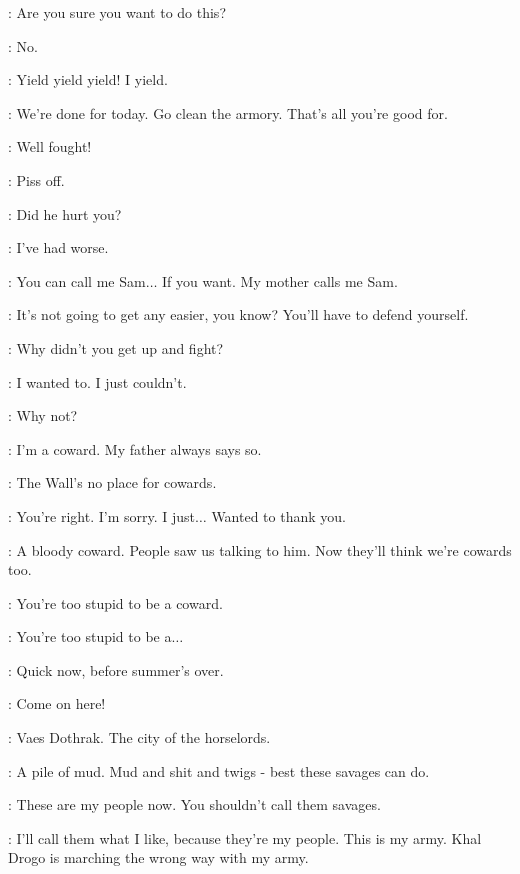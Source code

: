 \JON: Are you sure you want to do this? 

\GRENN: No.


\GRENN: Yield yield yield! I yield. 

\ALLISER: We're done for today. Go clean the armory. That's all you're good for. 

\PYP: Well fought! 

\GRENN: Piss off. 

\SAM:  Did he hurt you? 

\JON: I've had worse. 

\SAM: You can call me Sam$\ldots$ If you want. My mother calls me Sam. 

\JON: It's not going to get any easier, you know? You'll have to defend yourself. 

\GRENN: Why didn't you get up and fight? 

\SAM: I wanted to. I just couldn't. 

\GRENN: Why not? 

\SAM: I'm a coward. My father always says so. 

\JON: The Wall's no place for cowards. 

\SAM: You're right. I'm sorry. I just$\ldots$ Wanted to thank you. 

\GRENN: A bloody coward. People saw us talking to him. Now they'll think we're cowards too. 

\PYP: You're too stupid to be a coward. 

\GRENN: You're too stupid to be a$\ldots$ 

\PYP: Quick now, before summer's over. 

\GRENN: Come on here! 

\scene



\JORAH: Vaes Dothrak. The city of the horselords. 

\VISERYS: A pile of mud. Mud and shit and twigs - best these savages can do. 

\DAENERYS: These are my people now. You shouldn't call them savages. 

\VISERYS: I'll call them what I like, because they're my people. This is my army. Khal Drogo is marching the wrong way with my army. 

